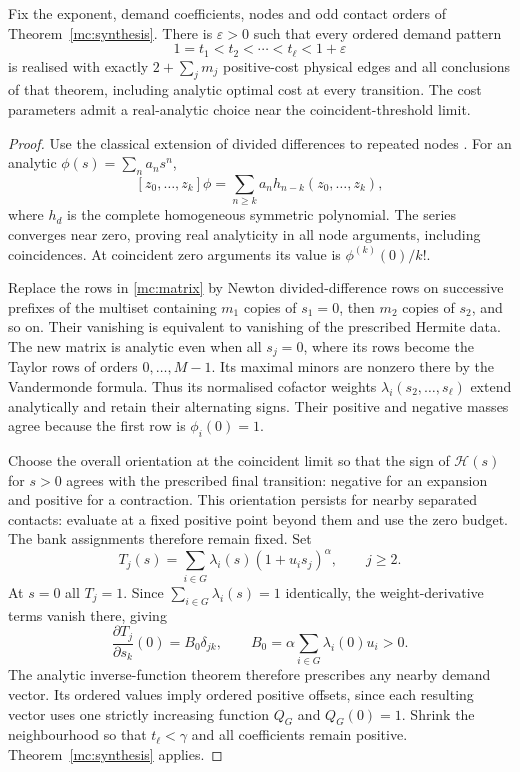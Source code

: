 \begin{corollary}\label{mc:prescribeddemand}
Fix the exponent, demand coefficients, nodes and odd contact orders of Theorem~\ref{mc:synthesis}. There is $\varepsilon>0$ such that every ordered demand pattern
\begin{equation}
 1=t_1<t_2<\cdots<t_\ell<1+\varepsilon
\end{equation}
is realised with exactly $2+\sum_jm_j$ positive-cost physical edges and all conclusions of that theorem, including analytic optimal cost at every transition. The cost parameters admit a real-analytic choice near the coincident-threshold limit.
\end{corollary}
\begin{proof}
Use the classical extension of divided differences to repeated nodes \cite{deBoor2005}. For an analytic $\phi(s)=\sum_na_ns^n$,
\begin{equation}\label{mc:divdiffanalytic}
 [z_0,\ldots,z_k]\phi
 =\sum_{n\ge k}a_n h_{n-k}(z_0,\ldots,z_k),
\end{equation}
where $h_d$ is the complete homogeneous symmetric polynomial. The series converges near zero, proving real analyticity in all node arguments, including coincidences. At coincident zero arguments its value is $\phi^{(k)}(0)/k!$.

Replace the rows in \eqref{mc:matrix} by Newton divided-difference rows on successive prefixes of the multiset containing $m_1$ copies of $s_1=0$, then $m_2$ copies of $s_2$, and so on. Their vanishing is equivalent to vanishing of the prescribed Hermite data. The new matrix is analytic even when all $s_j=0$, where its rows become the Taylor rows of orders $0,\ldots,M-1$. Its maximal minors are nonzero there by the Vandermonde formula. Thus its normalised cofactor weights $\lambda_i(s_2,\ldots,s_\ell)$ extend analytically and retain their alternating signs. Their positive and negative masses agree because the first row is $\phi_i(0)=1$.

Choose the overall orientation at the coincident limit so that the sign of $\mathcal H(s)$ for $s>0$ agrees with the prescribed final transition: negative for an expansion and positive for a contraction. This orientation persists for nearby separated contacts: evaluate at a fixed positive point beyond them and use the zero budget. The bank assignments therefore remain fixed. Set
\begin{equation}
 T_j(s)=\sum_{i\in G}\lambda_i(s)(1+u_is_j)^\alpha,\qquad j\ge2.
\end{equation}
At $s=0$ all $T_j=1$. Since $\sum_{i\in G}\lambda_i(s)=1$ identically, the weight-derivative terms vanish there, giving
\begin{equation}
 \frac{\partial T_j}{\partial s_k}(0)=B_0\delta_{jk},\qquad
 B_0=\alpha\sum_{i\in G}\lambda_i(0)u_i>0.
\end{equation}
The analytic inverse-function theorem therefore prescribes any nearby demand vector. Its ordered values imply ordered positive offsets, since each resulting vector uses one strictly increasing function $Q_G$ and $Q_G(0)=1$. Shrink the neighbourhood so that $t_\ell<\gamma$ and all coefficients remain positive. Theorem~\ref{mc:synthesis} applies.
\end{proof}

